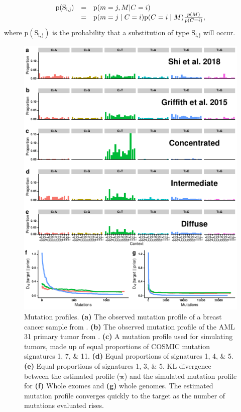 \documentclass[a4,center,fleqn]{NAR}
\begin{document}
\begin{equation}
  \label{eqn:detailed_prior}
  $$
  \begin{array}{rcl}
  \mathrm{p}(\mathrm{S_{i,j}}) &=&  \mathrm{p}(m =j, M | C = i) \\
                            &=& \mathrm{p}(m = j \mid C = i) \mathrm{p}(C = i \mid M)\frac{p(M)}{p(C = i)},
  \end{array}
  $$
\end{equation}
where $\mathrm{p}(\mathrm{S_{i,j}})$ is the probability that a substitution of type $\mathrm{S_{i,j}}$ will occur.

\begin{figure}[t]
  \begin{center}
  \includegraphics{figures/signature_figure.pdf}
  \end{center}
  \caption{Mutation profiles. 
  \textbf{(a)} The observed mutation profile of a breast cancer sample from \cite{Shi2018}.
  \textbf{(b)} The observed mutation profile of the AML 31 primary tumor from \cite{Griffith2015}.
  \textbf{(c)} A mutation profile used for simulating tumors, made up of equal proportions of COSMIC mutation signatures 1, 7, \& 11.
  \textbf{(d)} Equal proportions of signatures 1, 4, \& 5.
  \textbf{(e)} Equal proportions of signatures 1, 3, \& 5.
  KL divergence between the estimated profile ($\boldsymbol{\pi}$) and the simulated mutation profile for \textbf{(f)} Whole exomes and \textbf{(g)} whole genomes.
  The estimated mutation profile converges quickly to the target as the number of mutations evaluated rises.
  }
  \label{NAR-sigfig}
  \end{figure}
\end{document}
